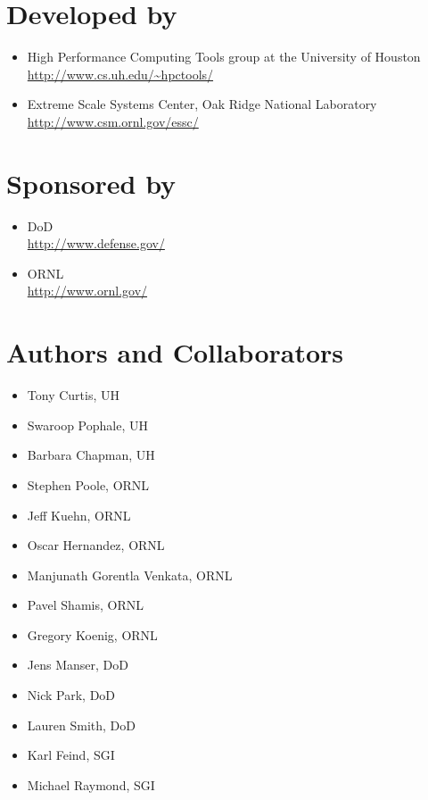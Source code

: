 \vfill{}

\section*{Developed by}
\begin{itemize}
\item High Performance Computing Tools group at the University of Houston\\
  \url{http://www.cs.uh.edu/~hpctools/} 
\item Extreme Scale Systems Center, Oak Ridge National Laboratory\\
  \url{http://www.csm.ornl.gov/essc/} 
\end{itemize}
\pagebreak{}

\section*{Sponsored by}
\begin{itemize}
\item \ac{DoD}\\
  \url{http://www.defense.gov/ }
\item \ac{ORNL}\\
  \url{http://www.ornl.gov/} 
\end{itemize}

\section*{Authors and Collaborators}
\begin{itemize}
\item Tony Curtis, \ac{UH}
\item Swaroop Pophale, \ac{UH}
\item Barbara Chapman, \ac{UH} 
\item Stephen Poole, \ac{ORNL}
\item Jeff Kuehn, \ac{ORNL}
\item Oscar Hernandez, \ac{ORNL}
\item Manjunath Gorentla Venkata, \ac{ORNL}
\item Pavel Shamis, \ac{ORNL}
\item Gregory Koenig, \ac{ORNL}
\item Jens Manser, \ac{DoD}
\item Nick Park, \ac{DoD}
\item Lauren Smith, \ac{DoD}
\item Karl Feind, SGI
\item Michael Raymond, SGI
\end{itemize}

